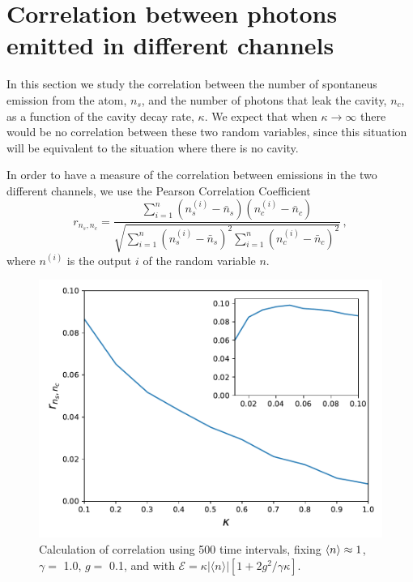 \documentclass[%
 reprint,
 amsmath,amssymb,
 aps, 
]{revtex4-2}
\begin{document}
\section{Correlation between photons emitted in different channels}\label{sc:correlation}
In this section we study the correlation between the number of
spontaneus emission from the atom, $n_s$, and the number of photons
that leak the cavity, $n_c$, as a function of the cavity decay rate,
$\kappa$. We expect that when $\kappa\rightarrow\infty$ there would be
no correlation between these two random variables, since this
situation will be equivalent to the situation where there is no
cavity.

In order to have a measure of the correlation between emissions in the
two different channels, we use the Pearson Correlation Coefficient
\cite{benesty2009pearson}
\begin{equation} 
r_{n_s,n_c} = \frac{\sum\limits_{i=1}^n(n_s^{(i)} -
  \bar{n}_s)(n_c^{(i)} - \bar{n}_c)}{\sqrt{\sum\limits_{i=1}^n(n_s^{(i)}
    - \bar{n}_s)^2\sum\limits_{i=1}^n(n_c^{(i)} - \bar{n}_c)^2}}\, ,  \label{correlationc}
\end{equation}
where $n^{(i)}$ is the output $i$ of the random variable $n$.

\begin{center}
\begin{figure}[t!]
\begin{center}
\includegraphics[scale = 0.5]{million1.pdf}
\caption{\small{Calculation of correlation using 500 time intervals, fixing $\expval{n} \approx 1$, $\gamma =$ 1.0, $g = $ 0.1, and with  $\mathcal{E} =  \kappa |\langle n \rangle|[1 + 2g^2/\gamma \kappa]$.}} \label{corrxy}
\end{center}  
\end{figure}
\end{center}
\end{document}
